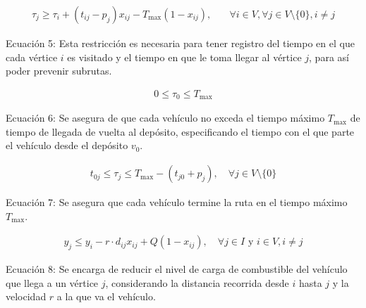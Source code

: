 \documentclass[letter, 10pt]{article}
\begin{document}


\begin{align}
    \tau_j \geq \tau_i + (t_{ij} - p_j)x_{ij} - T_{\text{max}}(1 - x_{ij}), & \quad \forall i \in V, \forall j \in V \text{\textbackslash}\{0\}, i \neq j
\end{align}

\begin{center}
    Ecuación 5: Esta restricción es necesaria para tener registro del tiempo en el que cada vértice $i$ es visitado y el tiempo en que le toma llegar al vértice $j$, para así poder prevenir subrutas.
\end{center}


\begin{align}
    0 \leq \tau_0 \leq T_{\text{max}}
\end{align}

\begin{center}
    Ecuación 6: Se asegura de que cada vehículo no exceda el tiempo máximo $T_{\text{max}}$ de tiempo de llegada de vuelta al depósito, especificando el tiempo con el que parte el vehículo desde el depósito $v_0$.
\end{center}

\begin{align}
    t_{0j} \leq \tau_j \leq T_{\text{max}} - (t_{j0} + p_j), \quad \forall j \in V \text{\textbackslash}\{0\}
\end{align}

\begin{center}
    Ecuación 7: Se asegura que cada vehículo termine la ruta en el tiempo máximo $T_{\text{max}}$.
\end{center}

\begin{align}
    y_j \leq y_i - r \cdot d_{ij}x_{ij} + Q(1 - x_{ij}), \quad \forall j \in I \text{ y } i \in V, i \neq j
\end{align}

\begin{center}
    Ecuación 8: Se encarga de reducir el nivel de carga de combustible del vehículo que llega a un vértice $j$, considerando la distancia recorrida desde $i$ hasta $j$ y la velocidad $r$ a la que va el vehículo.
\end{center}
\end{document}
